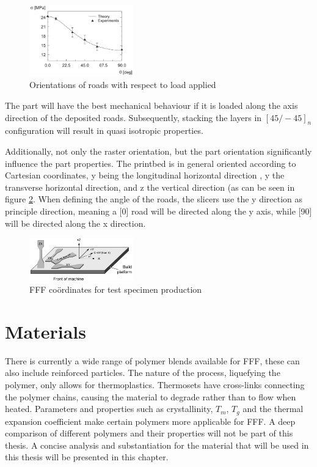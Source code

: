\begin{figure}[H]
    \centering
    \includegraphics[width=0.4\textwidth]{chapter_2/figures/Orientation.PNG}
    \caption{Orientations of roads with respect to load applied \cite{Rodriguez2003MechanicalModeling}}
    \label{fig:Orientation}
\end{figure}

The part will have the best mechanical behaviour if it is loaded along the axis direction of the deposited roads. Subsequently, stacking the layers in  $[45/-45]_n$ configuration will result in quasi isotropic properties.

Additionally, not only the raster orientation, but the part orientation significantly influence the part properties. The printbed is in general oriented according to Cartesian coordinates, y being the longitudinal horizontal direction , y the transverse horizontal direction, and z the vertical direction (as can be seen in figure \ref{fig:coordinates}. When defining the angle of the roads, the slicers use the y direction as principle direction, meaning a [0] road will be directed along the y axis, while [90] will be directed along the x direction. 


\begin{figure}[H]
    \centering
    \includegraphics[width=0.4\textwidth]{chapter_2/figures/Coordinates.png}
    \caption{FFF coördinates for test specimen production}
    \label{fig:coordinates}
\end{figure}


\section{Materials}
There is currently a wide range of polymer blends available for FFF, these can also include reinforced particles. The nature of the process, liquefying the polymer, only allows for thermoplastics. Thermosets have cross-links connecting the polymer chains, causing the material to degrade rather than to flow when heated. Parameters and properties such as crystallinity, $T_m$, $T_g$ and the thermal expansion coefficient make certain polymers more applicable for FFF.  A deep comparison of different polymers and their properties will not be part of this thesis. A concise analysis and substantiation for the material that will be used in this thesis will be presented in this chapter.

